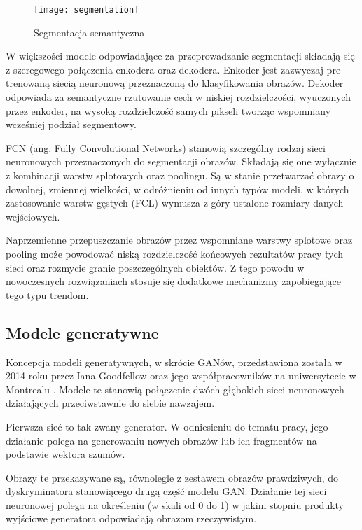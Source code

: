    \begin{figure}[h]
    \centering
    \texttt{[image: segmentation]}
    \caption[Segmentacja semantyczna - źródło: \url{https://devblogs.nvidia.com/image-segmentation-using-digits-5/}]{Segmentacja semantyczna}
    \label{fig:segmentation}
  \end{figure}

   W większości modele odpowiadające za przeprowadzanie segmentacji składają się z szeregowego połączenia enkodera oraz dekodera. Enkoder jest zazwyczaj pre-trenowaną siecią neuronową przeznaczoną do klasyfikowania obrazów. Dekoder odpowiada za semantyczne rzutowanie cech w niskiej rozdzielczości, wyuczonych przez enkoder, na wysoką rozdzielczość samych pikseli tworząc wspomniany wcześniej podział segmentowy.

   FCN (ang. Fully Convolutional Networks) stanowią szczególny rodzaj sieci neuronowych przeznaczonych do segmentacji obrazów. Składają się one wyłącznie z kombinacji warstw splotowych oraz poolingu. Są w stanie przetwarzać obrazy o dowolnej, zmiennej wielkości, w odróżnieniu od innych typów modeli, w których zastosowanie warstw gęstych (FCL) wymusza z góry ustalone rozmiary danych wejściowych.

   Naprzemienne przepuszczanie obrazów przez wspomniane warstwy splotowe oraz pooling może powodować niską rozdzielczość końcowych rezultatów pracy tych sieci oraz rozmycie granic poszczególnych obiektów. Z tego powodu w nowoczesnych rozwiązaniach stosuje się dodatkowe mechanizmy zapobiegające tego typu trendom.

  \subsection{Modele generatywne}
  \label{modele_generatywne}
   Koncepcja modeli generatywnych, w skrócie GANów, przedstawiona została w 2014 roku przez Iana Goodfellow oraz jego współpracowników na uniwersytecie w Montrealu \cite{gan}. Modele te stanowią połączenie dwóch głębokich sieci neuronowych działających przeciwstawnie do siebie nawzajem.

   Pierwsza sieć to tak zwany generator. W odniesieniu do tematu pracy, jego działanie polega na generowaniu nowych obrazów lub ich fragmentów na podstawie wektora szumów.

   Obrazy te przekazywane są, równolegle z zestawem obrazów prawdziwych, do dyskryminatora stanowiącego drugą część modelu GAN. Działanie tej sieci neuronowej polega na określeniu (w skali od 0 do 1) w jakim stopniu produkty wyjściowe generatora odpowiadają obrazom rzeczywistym.

